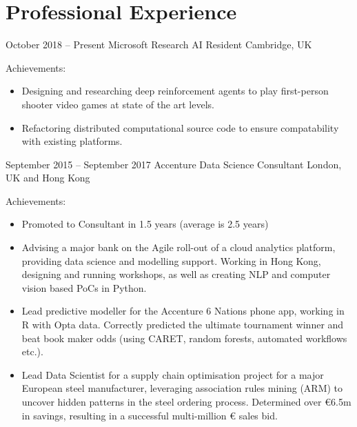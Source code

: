 \documentclass[]{friggeri-cv} %
\begin{document}

\section{Professional Experience}


\begin{entrylist}


\entry
{October 2018 -- Present}
{Microsoft Research}
{AI Resident}
{Cambridge, UK}
{Achievements:
\begin{itemize}
    \item Designing and researching deep reinforcement agents to play first-person shooter video games at state of the art levels.
    \item Refactoring distributed computational source code to ensure compatability with existing platforms.
\end{itemize}
}

\entry
{September 2015 -- September 2017}
{Accenture}
{Data Science Consultant}
{London, UK and Hong Kong}
{Achievements:
\begin{itemize}
    \item Promoted to Consultant in 1.5 years (average is 2.5 years)
    \item Advising a major bank on the Agile roll-out of a cloud analytics platform, providing data
    science and modelling support. Working in Hong Kong, designing and running workshops,
    as well as creating NLP and computer vision based PoCs in Python.
    \item Lead predictive modeller for the Accenture 6 Nations phone app, working in R with Opta
    data. Correctly predicted the ultimate tournament winner and beat book maker odds
    (using CARET, random forests, automated workflows etc.).
    \item Lead Data Scientist for a supply chain optimisation project for a major European steel
    manufacturer, leveraging association rules mining (ARM) to uncover hidden patterns in
    the steel ordering process. Determined over €6.5m in savings, resulting in a successful
    multi-million € sales bid.
    
\end{itemize}}






\end{entrylist}
\end{document}
